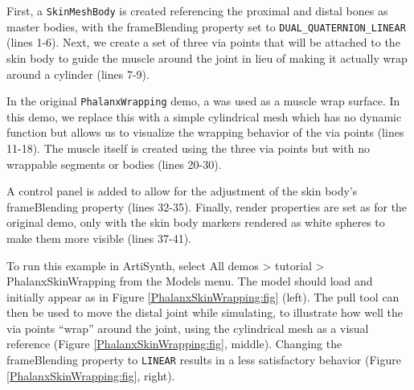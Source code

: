 First, a {\tt SkinMeshBody} is created referencing the proximal and
distal bones as master bodies, with the {\sf frameBlending} property
set to {\tt DUAL\_QUATERNION\_LINEAR} (lines 1-6).  Next, we create a
set of three via points that will be attached to the skin body to
guide the muscle around the joint in lieu of making it actually wrap
around a cylinder (lines 7-9).

In the original {\tt PhalanxWrapping} demo, a
 was used as a
muscle wrap surface. In this demo, we replace this with a simple
cylindrical mesh which has no dynamic function but allows us to
visualize the wrapping behavior of the via points (lines 11-18).  The
muscle itself is created using the three via points but with no
wrappable segments or bodies (lines 20-30).

A control panel is added to allow for the adjustment of the skin
body's {\sf frameBlending} property (lines 32-35). Finally, render
properties are set as for the original demo, only with the skin body
markers rendered as white spheres to make them more visible (lines
37-41).

To run this example in ArtiSynth, select {\sf All demos > tutorial >
PhalanxSkinWrapping} from the {\sf Models} menu. The model should load
and initially appear as in Figure \ref{PhalanxSkinWrapping:fig}
(left). The pull tool can then be used to move the distal joint
while simulating, to illustrate how well the via points ``wrap''
around the joint, using the cylindrical mesh as a visual reference
(Figure \ref{PhalanxSkinWrapping:fig}, middle).  Changing the {\sf
frameBlending} property to {\tt LINEAR} results in a less satisfactory
behavior (Figure \ref{PhalanxSkinWrapping:fig}, right).

\ifdefined\maindoc
\else

\fi
